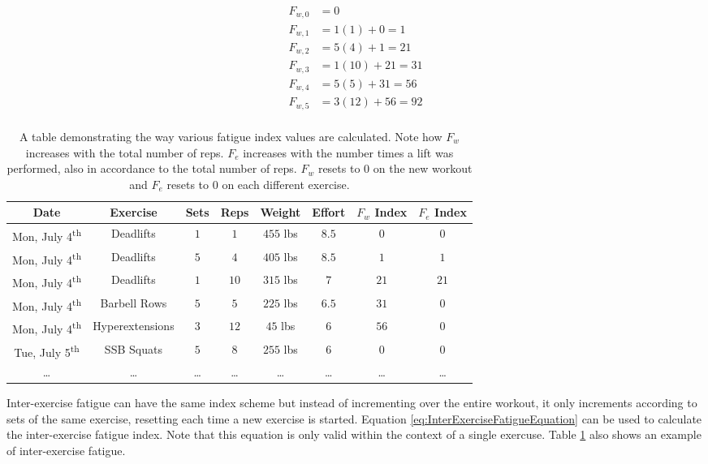 \begin{equation*}
	\begin{aligned}
		F_{w,0} & =0 \\
		F_{w,1} & =1(1)+0=1 \\
		F_{w,2} & =5(4)+1=21 \\
		F_{w,3} & =1(10)+21=31 \\
		F_{w,4} & =5(5)+31=56 \\
		F_{w,5} & =3(12)+56=92  \\
	\end{aligned}
\end{equation*}

\begin{table}[h]
	\centering
	\begin{tabular}{c|c|c|c|c|c|c|c}
		Date & Exercise & Sets & Reps & Weight & Effort & $F_w$ Index & $F_e$ Index \\
        \hline
        Mon, July 4\textsuperscript{th} & Deadlifts & $1$ & $1$ & $455$ lbs & $8.5$ & $0$ & $0$ \\
        Mon, July 4\textsuperscript{th} & Deadlifts & $5$ & $4$ & $405$ lbs & $8.5$ & $1$ & $1$ \\
        Mon, July 4\textsuperscript{th} & Deadlifts & $1$ & $10$ & $315$ lbs & $7$ & $21$ & $21$ \\
        Mon, July 4\textsuperscript{th} & Barbell Rows & $5$ & $5$ & $225$ lbs & $6.5$ & $31$ & $0$ \\
        Mon, July 4\textsuperscript{th} & Hyperextensions & $3$ & $12$ & $45$ lbs & $6$ & $56$ & $0$ \\
        Tue, July 5\textsuperscript{th} & SSB Squats & $5$ & $8$ & $255$ lbs & $6$ & $0$ & $0$ \\
        \dots & \dots & \dots & \dots & \dots & \dots & \dots & \dots  \\
	\end{tabular}
	\caption{A table demonstrating the way various fatigue index values are calculated. Note how $F_w$ increases with the total number of reps. $F_e$ increases with the number times a lift was performed, also in accordance to the total number of reps. $F_w$ resets to $0$ on the new workout and $F_e$ resets to $0$ on each different exercise.}
	\label{tab:IndexesExample}
\end{table}

Inter-exercise fatigue can have the same index scheme but instead of incrementing over the entire workout, it only increments according to sets of the same exercise, resetting each time a new exercise is started. Equation \ref{eq:InterExerciseFatigueEquation} can be used to calculate the inter-exercise fatigue index. Note that this equation is only valid within the context of a single exercuse. Table \ref{tab:IndexesExample} also shows an example of inter-exercise fatigue.


